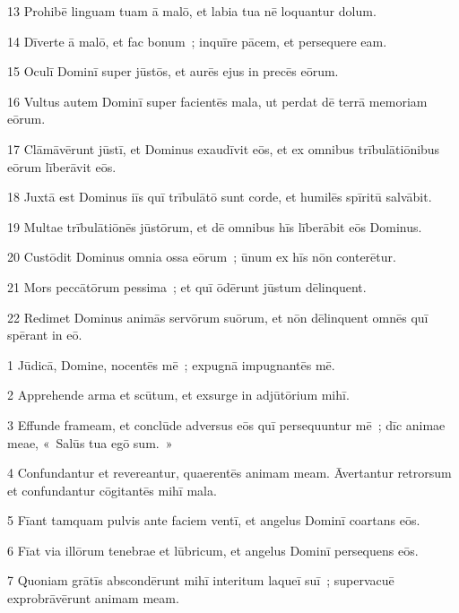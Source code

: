 \psalmVerse
  {\phantom{0}13}
  {Prohibē linguam tuam ā malō, et labia tua nē loquantur dolum.}


\psalmVerse
  {\phantom{0}14}
  {Dīverte ā malō, et fac bonum~; inquīre pācem, et persequere eam.}


\psalmVerse
  {\phantom{0}15}
  {Oculī Dominī super jūstōs, et aurēs ejus in precēs eōrum.}


\psalmVerse
  {\phantom{0}16}
  {Vultus autem Dominī super facientēs mala, ut perdat dē terrā memoriam eōrum.}


\psalmVerse
  {\phantom{0}17}
  {Clāmāvērunt jūstī, et Dominus exaudīvit eōs, et ex omnibus trībulātiōnibus eōrum līberāvit eōs.}


\psalmVerse
  {\phantom{0}18}
  {Juxtā est Dominus iīs quī trībulātō sunt corde, et humilēs spīritū salvābit.}


\psalmVerse
  {\phantom{0}19}
  {Multae trībulātiōnēs jūstōrum, et dē omnibus hīs līberābit eōs Dominus.}


\psalmVerse
  {\phantom{0}20}
  {Custōdit Dominus omnia ossa eōrum~; ūnum ex hīs nōn conterētur.}


\psalmVerse
  {\phantom{0}21}
  {Mors peccātōrum pessima~; et quī ōdērunt jūstum dēlinquent.}


\psalmVerse
  {\phantom{0}22}
  {Redimet Dominus animās servōrum suōrum, et nōn dēlinquent omnēs quī spērant in eō.}




\psalmVerse
  {\phantom{00}1}
  {Jūdicā, Domine, nocentēs mē~; expugnā impugnantēs mē.}


\psalmVerse
  {\phantom{00}2}
  {Apprehende arma et scūtum, et exsurge in adjūtōrium mihī.}


\psalmVerse
  {\phantom{00}3}
  {Effunde frameam, et conclūde adversus eōs quī persequuntur mē~; dīc animae meae, «~Salūs tua egō sum.~»}


\psalmVerse
  {\phantom{00}4}
  {Confundantur et revereantur, quaerentēs animam meam. Āvertantur retrorsum et confundantur cōgitantēs mihī mala.}


\psalmVerse
  {\phantom{00}5}
  {Fīant tamquam pulvis ante faciem ventī, et angelus Dominī coartans eōs.}


\psalmVerse
  {\phantom{00}6}
  {Fīat via illōrum tenebrae et lūbricum, et angelus Dominī persequens eōs.}


\psalmVerse
  {\phantom{00}7}
  {Quoniam grātīs abscondērunt mihī interitum laqueī suī~; supervacuē exprobrāvērunt animam meam.}


